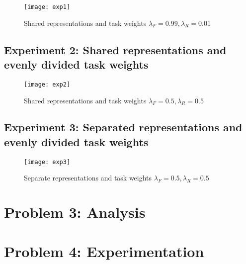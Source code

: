 \documentclass[]{article}
\begin{document}
	\begin{center} 
		\begin{figure}[H]
			\centering
			\texttt{[image: exp1]}
			\caption{Shared representations and task weights $\lambda_{F} = 0.99, \lambda_{R} = 0.01$}
		\end{figure}
	\end{center}

	\subsection{Experiment 2: Shared representations and evenly divided task weights}
	\begin{center} 
		\begin{figure}[H]
			\centering
			\texttt{[image: exp2]}
			\caption{Shared representations and task weights $\lambda_{F} = 0.5, \lambda_{R} = 0.5$}
		\end{figure}
	\end{center}

	\subsection{Experiment 3: Separated representations and evenly divided task weights}
	\begin{center} 
		\begin{figure}[H]
			\centering
			\texttt{[image: exp3]}
			\caption{Separate representations and task weights $\lambda_{F} = 0.5, \lambda_{R} = 0.5$}
		\end{figure}	
	\end{center}
	
	\section{Problem 3: Analysis}
	
	\section{Problem 4: Experimentation}
	
\end{document}
